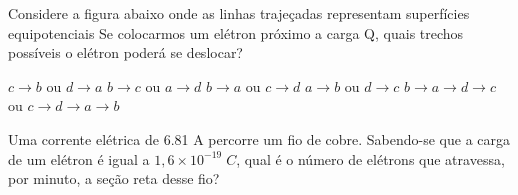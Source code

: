 \documentclass[12pt, addpoints]{exam}
\begin{document}
    \begin{questions}
\begin{multicols*}{2}
\question Considere a figura abaixo onde as linhas trajeçadas representam superfícies equipotenciais Se colocarmos um elétron próximo a carga Q, quais trechos possíveis o elétron poderá se deslocar?
        
        \begin{center}
            \begin{minipage}[c]{0.5\linewidth}
            \end{minipage}
        \end{center}
        
        

\begin{choices}
\choice $c\rightarrow b$ ou $d\rightarrow a$ 
\choice $b\rightarrow c$ ou $a\rightarrow d$ 
\choice $b\rightarrow a$ ou $c\rightarrow d$ 
\choice $a\rightarrow b$ ou $d\rightarrow c$ 
\choice $b\rightarrow a\rightarrow d\rightarrow c$ ou $c\rightarrow d\rightarrow a\rightarrow b$ 
\end{choices}
\question Uma corrente elétrica de    6.81 A percorre um ﬁo de cobre. Sabendo-se que a carga de um elétron é igual a $1,6\times 10^{-19}\;C$, qual é o número de elétrons que atravessa, por minuto, a seção reta desse ﬁo?


\end{multicols*}
\end{questions}
\end{document}
